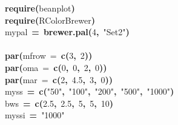 \documentclass{article}
\makeatletter
\newcommand{\hlnumber}[1]{\textcolor[rgb]{0,0,0}{#1}}%
\newcommand{\hlfunctioncall}[1]{\textcolor[rgb]{0.501960784313725,0,0.329411764705882}{\textbf{#1}}}%
\newcommand{\hlstring}[1]{\textcolor[rgb]{0.6,0.6,1}{#1}}%
\newcommand{\hlkeyword}[1]{\textcolor[rgb]{0,0,0}{\textbf{#1}}}%
\newcommand{\hlargument}[1]{\textcolor[rgb]{0.690196078431373,0.250980392156863,0.0196078431372549}{#1}}%
\newcommand{\hlassignement}[1]{\textcolor[rgb]{0,0,0}{\textbf{#1}}}%
\newcommand{\hlsymbol}[1]{\textcolor[rgb]{0,0,0}{#1}}%
\newcommand{\hlstd}[1]{\textcolor[rgb]{0,0,0}{#1}}%
\newenvironment{kframe}{%
 \def\FrameCommand##1{\hskip\@totalleftmargin \hskip-\fboxsep
 \colorbox{shadecolor}{##1}\hskip-\fboxsep
     \hskip-\linewidth \hskip-\@totalleftmargin \hskip\columnwidth}%
 \MakeFramed {\advance\hsize-\width
   \@totalleftmargin\z@ \linewidth\hsize
   \@setminipage}}%
 {\par\unskip\endMakeFramed}
\newenvironment{knitrout}{}{} %
\makeatother
\begin{document}
\begin{knitrout}
\color{fgcolor}\begin{kframe}
\begin{flushleft}
\ttfamily\noindent
\hlfunctioncall{require}\hlkeyword{(}\hlsymbol{beanplot}\hlkeyword{)}\hspace*{\fill}\\
\hlstd{}\hlfunctioncall{require}\hlkeyword{(}\hlsymbol{RColorBrewer}\hlkeyword{)}\hspace*{\fill}\\
\hlstd{}\hlsymbol{mypal}{\ }\hlassignement{=}{\ }\hlfunctioncall{brewer.pal}\hlkeyword{(}\hlnumber{4}\hlkeyword{,}{\ }\hlstring{"{}Set2"{}}\hlkeyword{)}\hspace*{\fill}\\
\hlstd{}\hspace*{\fill}\\
\hlstd{}\hlfunctioncall{par}\hlkeyword{(}\hlargument{mfrow}{\ }\hlargument{=}{\ }\hlfunctioncall{c}\hlkeyword{(}\hlnumber{3}\hlkeyword{,}{\ }\hlnumber{2}\hlkeyword{)}\hlkeyword{)}\hspace*{\fill}\\
\hlstd{}\hlfunctioncall{par}\hlkeyword{(}\hlargument{oma}{\ }\hlargument{=}{\ }\hlfunctioncall{c}\hlkeyword{(}\hlnumber{0}\hlkeyword{,}{\ }\hlnumber{0}\hlkeyword{,}{\ }\hlnumber{2}\hlkeyword{,}{\ }\hlnumber{0}\hlkeyword{)}\hlkeyword{)}\hspace*{\fill}\\
\hlstd{}\hlfunctioncall{par}\hlkeyword{(}\hlargument{mar}{\ }\hlargument{=}{\ }\hlfunctioncall{c}\hlkeyword{(}\hlnumber{2}\hlkeyword{,}{\ }\hlnumber{4.5}\hlkeyword{,}{\ }\hlnumber{3}\hlkeyword{,}{\ }\hlnumber{0}\hlkeyword{)}\hlkeyword{)}\hspace*{\fill}\\
\hlstd{}\hlsymbol{myss}{\ }\hlassignement{=}{\ }\hlfunctioncall{c}\hlkeyword{(}\hlstring{"{}50"{}}\hlkeyword{,}{\ }\hlstring{"{}100"{}}\hlkeyword{,}{\ }\hlstring{"{}200"{}}\hlkeyword{,}{\ }\hlstring{"{}500"{}}\hlkeyword{,}{\ }\hlstring{"{}1000"{}}\hlkeyword{)}\hspace*{\fill}\\
\hlstd{}\hlsymbol{bws}{\ }\hlassignement{=}{\ }\hlfunctioncall{c}\hlkeyword{(}\hlnumber{2.5}\hlkeyword{,}{\ }\hlnumber{2.5}\hlkeyword{,}{\ }\hlnumber{5}\hlkeyword{,}{\ }\hlnumber{5}\hlkeyword{,}{\ }\hlnumber{10}\hlkeyword{)}\hspace*{\fill}\\
\hlstd{}\hlsymbol{myssi}{\ }\hlassignement{=}{\ }\hlstring{"{}1000"{}}\hspace*{\fill}\\

\end{flushleft}
\end{kframe}
\end{knitrout}
\end{document}

